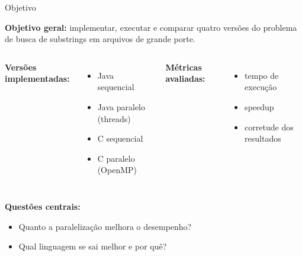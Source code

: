 \documentclass{beamer}
\begin{document}
\begin{frame}{Objetivo}

\textbf{Objetivo geral:} implementar, executar e comparar quatro versões
do problema de busca de substrings em arquivos de grande porte.

\vspace{0.4cm}

\begin{columns}
    \textbf{Versões implementadas:}
    \begin{itemize}
        \item Java sequencial
        \item Java paralelo (threads)
        \item C sequencial
        \item C paralelo (OpenMP)
    \end{itemize}

    \textbf{Métricas avaliadas:}
    \begin{itemize}
        \item tempo de execução
        \item speedup
        \item corretude dos resultados
    \end{itemize}
\end{columns}

\vspace{0.5cm}

\textbf{Questões centrais:}
\begin{itemize}
    \item Quanto a paralelização melhora o desempenho?
    \item Qual linguagem se sai melhor e por quê?
\end{itemize}

\end{frame}
\end{document}
